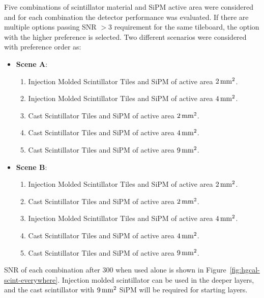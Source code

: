 Five combinations of scintillator material and \gls{SiPM} active area
were considered and for each combination the detector
performance was evaluated. If there are
multiple options passing \gls{SNR} \(> 3\) requirement for the same tileboard,
the option with the higher preference is selected. Two different scenarios were
considered with preference order as:

\begin{itemize}
  \item \textbf{Scene A}:
        \begin{enumerate}
          \item Injection Molded Scintillator Tiles and SiPM of active area \( 2\,\text{mm}{}^2 \).
          \item Injection Molded Scintillator Tiles and SiPM of active area \( 4\,\text{mm}{}^2 \).
          \item Cast Scintillator Tiles and SiPM of active area \( 2\,\text{mm}{}^2 \).
          \item Cast Scintillator Tiles and SiPM of active area \( 4\,\text{mm}{}^2 \).
          \item Cast Scintillator Tiles and SiPM of active area \( 9\,\text{mm}{}^2 \).
        \end{enumerate}
  \item \textbf{Scene B}:
        \begin{enumerate}
          \item Injection Molded Scintillator Tiles and SiPM of active area \( 2\,\text{mm}{}^2 \).
          \item Cast Scintillator Tiles and SiPM of active area \( 2\,\text{mm}{}^2 \).
          \item Injection Molded Scintillator Tiles and SiPM of active area \( 4\,\text{mm}{}^2 \).
          \item Cast Scintillator Tiles and SiPM of active area \( 4\,\text{mm}{}^2 \).
          \item Cast Scintillator Tiles and SiPM of active area \( 9\,\text{mm}{}^2 \).
        \end{enumerate}
\end{itemize}

\gls{SNR} of each combination after 300 \fbinv{} when used alone is shown in
Figure~\ref{fig:hgcal-scint-everywhere}.
Injection molded scintillator can be used in the deeper layers,
and the cast scintillator with \(9 \,\text{mm}{}^{2}\) \gls{SiPM} will be required
for starting layers.

